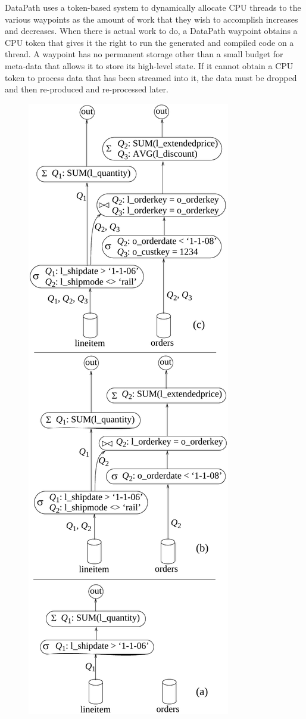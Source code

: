 \documentclass{sig-alternate}
\renewcommand\:{\colon} %
\begin{document}
DataPath uses a token-based
system to dynamically allocate CPU threads to the various waypoints as the amount of
work that they wish to accomplish increases and decreases.
When there is actual work to do, a DataPath waypoint obtains a CPU token that gives it the right
to run the generated and compiled code on a thread.  A waypoint has no permanent storage other than
a small budget for meta-data that allows it to store its high-level state.  If it cannot obtain a CPU
token to process data that has been streamed into it, the data must be dropped and then re-produced 
and re-processed later.

\begin{figure} [t!]
\centering
\includegraphics[scale = .80]{IntroExample}

\end{figure}
\end{document}
